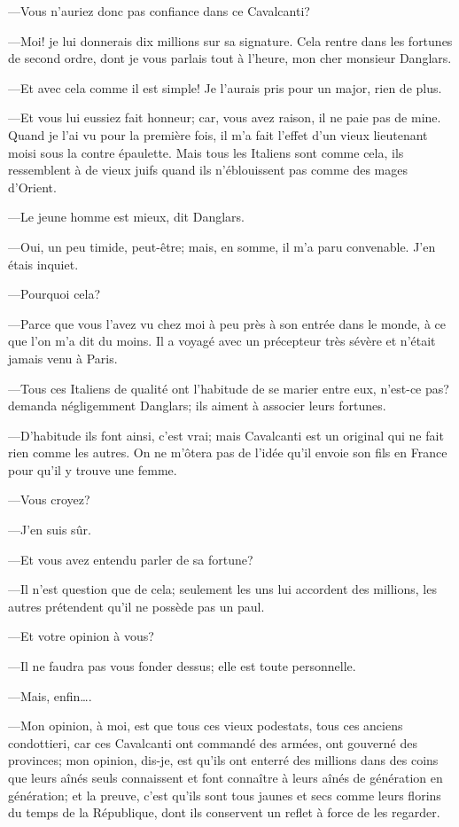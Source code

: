 —Vous n'auriez donc pas confiance dans ce Cavalcanti? 

—Moi! je lui donnerais dix millions sur sa signature. Cela rentre dans les fortunes de second ordre, dont je vous parlais tout à l'heure, mon cher monsieur Danglars. 

—Et avec cela comme il est simple! Je l'aurais pris pour un major, rien de plus. 

—Et vous lui eussiez fait honneur; car, vous avez raison, il ne paie pas de mine. Quand je l'ai vu pour la première fois, il m'a fait l'effet d'un vieux lieutenant moisi sous la contre épaulette. Mais tous les Italiens sont comme cela, ils ressemblent à de vieux juifs quand ils n'éblouissent pas comme des mages d'Orient. 

—Le jeune homme est mieux, dit Danglars. 

—Oui, un peu timide, peut-être; mais, en somme, il m'a paru convenable. J'en étais inquiet. 

—Pourquoi cela? 

—Parce que vous l'avez vu chez moi à peu près à son entrée dans le monde, à ce que l'on m'a dit du moins. Il a voyagé avec un précepteur très sévère et n'était jamais venu à Paris. 

—Tous ces Italiens de qualité ont l'habitude de se marier entre eux, n'est-ce pas? demanda négligemment Danglars; ils aiment à associer leurs fortunes. 

—D'habitude ils font ainsi, c'est vrai; mais Cavalcanti est un original qui ne fait rien comme les autres. On ne m'ôtera pas de l'idée qu'il envoie son fils en France pour qu'il y trouve une femme. 

—Vous croyez? 

—J'en suis sûr. 

—Et vous avez entendu parler de sa fortune? 

—Il n'est question que de cela; seulement les uns lui accordent des millions, les autres prétendent qu'il ne possède pas un paul. 

—Et votre opinion à vous? 

—Il ne faudra pas vous fonder dessus; elle est toute personnelle. 

—Mais, enfin\dots. 

—Mon opinion, à moi, est que tous ces vieux podestats, tous ces anciens condottieri, car ces Cavalcanti ont commandé des armées, ont gouverné des provinces; mon opinion, dis-je, est qu'ils ont enterré des millions dans des coins que leurs aînés seuls connaissent et font connaître à leurs aînés de génération en génération; et la preuve, c'est qu'ils sont tous jaunes et secs comme leurs florins du temps de la République, dont ils conservent un reflet à force de les regarder. 

